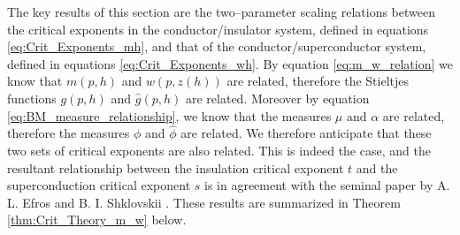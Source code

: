 \documentclass[english,12pt,jmp,graphicx]{revtex4-1}
\newcommand{\ph}{\hat{\phi}}
\begin{document}
The key results of this section are the two--parameter scaling
relations between the critical exponents in the conductor/insulator
system, defined in equations \eqref{eq:Crit_Exponents_mh},
and that of the conductor/superconductor system,
defined in equations \eqref{eq:Crit_Exponents_wh}.
By equation \eqref{eq:m_w_relation} we know that $m(p,h)$ and $w(p,z(h))$
are related, therefore the Stieltjes functions $g(p,h)$ and
$\hat{g}(p,h)$ are related. Moreover by equation
\eqref{eq:BM_measure_relationship}, we know that the measures $\mu$ and
$\alpha$ are related, therefore the measures $\phi$ and $\ph$ are related. We
therefore anticipate that these two sets of critical exponents
are also related. This is indeed the case, and the resultant
relationship between the insulation critical exponent $t$ and the
superconduction critical exponent $s$ is in agreement with the seminal
paper by A. L. Efros and B. I. Shklovskii \cite{Efros:PSSB-303}.
These results are summarized in Theorem \ref{thm:Crit_Theory_m_w}
below. 
%
%
%
\end{document}
